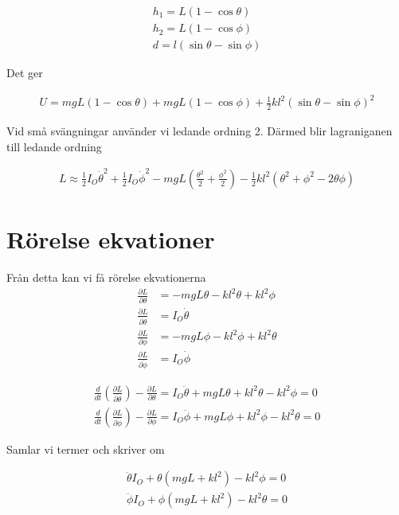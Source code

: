 \documentclass[a4paper]{article}
\begin{document}
\begin{align}
    h_1 = L(1-\cos\theta)\\
    h_2 = L(1-\cos\phi)\\
    d = l(\sin\theta-\sin\phi)
\end{align}

Det ger

\begin{align}
    U = mgL(1-\cos\theta) + mgL(1-\cos\phi) + \frac{1}{2}kl^2(\sin\theta-\sin\phi)^2
\end{align}

Vid små svängningar använder vi ledande ordning 2. Därmed blir lagraniganen till ledande ordning

\begin{align}
    L \approx \frac{1}{2}I_O\dot{\theta}^2 + \frac{1}{2}I_O\dot{\phi}^2 - mgL\left (\frac{\theta^2}{2}+\frac{\phi^2}{2}\right ) - \frac{1}{2}kl^2(\theta^2 +\phi^2-2\theta\phi)
\end{align}

\section{Rörelse ekvationer}

Från detta kan vi få rörelse ekvationerna
\begin{align}
    \frac{\partial L}{\partial \theta} &= -mgL\theta - kl^2\theta + kl^2\phi \\
    \frac{\partial L}{\partial \dot{\theta}} &= I_O\dot{\theta} \\
    \frac{\partial L}{\partial \phi} &= -mgL\phi - kl^2\phi + kl^2\theta \\
    \frac{\partial L}{\partial \dot{\phi}} &= I_O \dot{\phi}
\end{align}

\begin{align}
    \frac{d}{dt}(\frac{\partial L}{\partial \dot{\theta}}) - \frac{\partial L}{\partial \theta} = I_O\ddot{\theta} + mgL\theta +kl^2\theta - kl^2\phi = 0\\
    \frac{d}{dt}(\frac{\partial L}{\partial \dot{\phi}}) - \frac{\partial L}{\partial \phi} = I_O\ddot{\phi} + mgL\phi + kl^2\phi - kl^2\theta = 0
\end{align}

Samlar vi termer och skriver om

\begin{align}
    \ddot{\theta}I_O + \theta(mgL+kl^2) - kl^2\phi = 0 \\
    \ddot{\phi}I_O + \phi(mgL+kl^2) - kl^2\theta = 0
\end{align}
\end{document}
